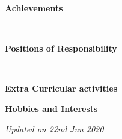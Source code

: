 \documentclass[a4paper,10pt]{article}
\begin{document}
\colorbox{titleColor}{\parbox{6.7in}{\textbf{Achievements}}}\\[0.08in]
\begin{itemize}
  \setlength{\itemsep}{1pt}
\end{itemize}

\colorbox{titleColor}{\parbox{6.7in}{\textbf{Positions of Responsibility}}}\\

\colorbox{titleColor}{\parbox{6.7in}{\textbf{Extra Curricular activities}}}
\begin{itemize}
  \setlength{\itemsep}{1pt}
\end{itemize}

\colorbox{titleColor}{\parbox{6.7in}{\textbf{Hobbies and Interests}}}
\begin{itemize}
  \setlength{\itemsep}{1pt}
\end{itemize}

\textit{Updated on 22nd Jun 2020}
\end{document}
